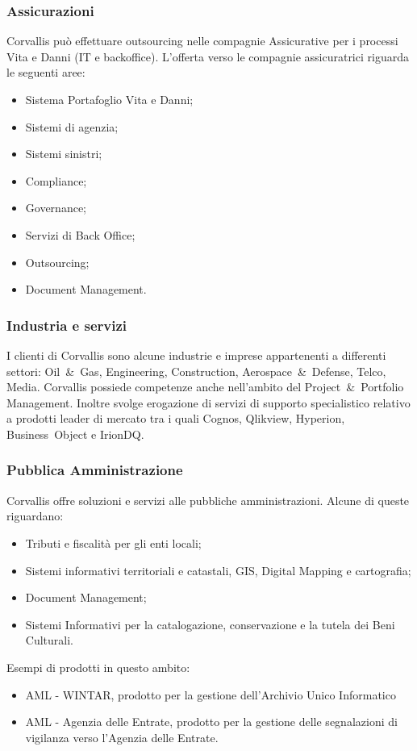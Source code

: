 \subsubsection{Assicurazioni}
\label{1.2.2}
Corvallis può effettuare outsourcing nelle compagnie Assicurative per i processi Vita e Danni (IT e backoffice). L'offerta verso le compagnie assicuratrici riguarda le seguenti aree:
\begin{itemize}
\item Sistema Portafoglio Vita e Danni;
\item Sistemi di agenzia;
\item Sistemi sinistri;
\item Compliance;
\item Governance;
\item Servizi di Back Office;
\item Outsourcing;
\item Document Management.
\end{itemize}

\subsubsection{Industria e servizi}
\label{1.2.3}
I clienti di Corvallis sono alcune industrie e imprese appartenenti a differenti settori: Oil~\&~Gas, Engineering, Construction, Aerospace~\&~Defense, Telco, Media. Corvallis possiede competenze anche nell'ambito del Project~\&~Portfolio Management. Inoltre svolge erogazione di servizi di supporto specialistico relativo a prodotti leader di mercato tra i quali Cognos, Qlikview, Hyperion, Business~Object e IrionDQ.
\subsubsection{Pubblica Amministrazione}
\label{1.2.4}
Corvallis offre soluzioni e servizi alle pubbliche amministrazioni. Alcune di queste riguardano:
\begin{itemize}
\item Tributi e fiscalità per gli enti locali;
\item Sistemi informativi territoriali e catastali, GIS, Digital Mapping e cartografia;
\item Document Management;
\item Sistemi Informativi per la catalogazione, conservazione e la tutela dei Beni Culturali.\\
\end{itemize}
Esempi di prodotti in questo ambito:
\begin{itemize}
\item AML - WINTAR, prodotto per la gestione dell'Archivio Unico Informatico
\item AML - Agenzia delle Entrate, prodotto per la gestione delle segnalazioni di vigilanza verso l'Agenzia delle Entrate.
\end{itemize}
